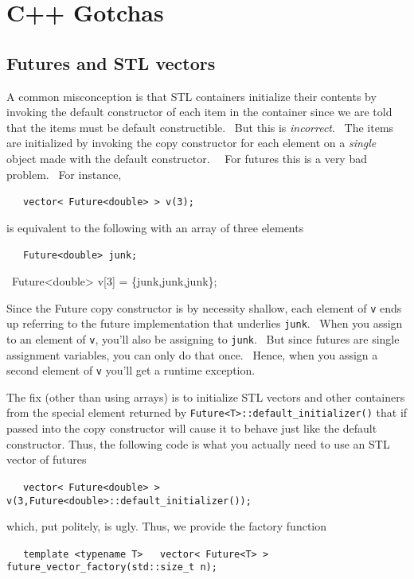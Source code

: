 \documentclass[letterpaper]{article}
\begin{document}
\section[C++ Gotchas]{C++ Gotchas}
\subsection{Futures and STL vectors}
A common misconception is that STL containers initialize their contents by invoking the default constructor of each item
in the container since we are told that the items must be default constructible. \ But this is\textit{ incorrect}.
\ The items are initialized by invoking the copy constructor for each element on a \textit{single }object made with the
default constructor. \ \ For futures this is a very bad problem. \ For instance,

\ \ \ \texttt{vector{\textless} Future{\textless}double{\textgreater} {\textgreater} v(3);}

is equivalent to the following with an array of three elements

\ \ \ \texttt{Future{\textless}double{\textgreater} junk;}

{\ttfamily
\ Future{\textless}double{\textgreater} v[3] = \{junk,junk,junk\};}

Since the Future copy constructor is by necessity shallow, each element of \texttt{v} ends up referring to the future
implementation that underlies \texttt{junk}. \ When you assign to an element of \texttt{v}, you'll also be assigning to
\texttt{junk}. \ But since futures are single assignment variables, you can only do that once. \ Hence, when you assign
a second element of \texttt{v} you'll get a runtime exception.

The fix (other than using arrays) is to initialize STL vectors and other containers from the special element returned by
\texttt{Future{\textless}T{\textgreater}::default\_initializer()} that if passed into the copy constructor will cause
it to behave just like the default constructor. Thus, the following code is what you actually need to use an STL vector
of futures

\ \ \ \texttt{vector{\textless} Future{\textless}double{\textgreater} {\textgreater}
v(3,Future{\textless}double{\textgreater}::default\_initializer());}

which, put politely, is ugly. Thus, we provide the factory function

\ \ \texttt{\ template {\textless}typename T{\textgreater}\newline
 \ \ vector{\textless} Future{\textless}T{\textgreater} {\textgreater} future\_vector\_factory(std::size\_t n);}
\end{document}
